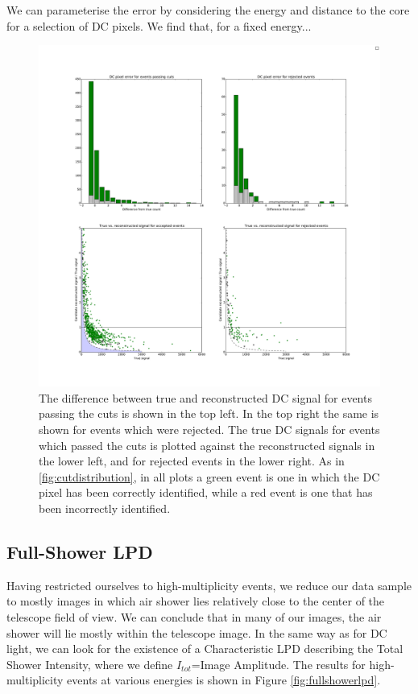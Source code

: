 \documentclass{article}
\begin{document}
We can parameterise the error by considering the energy and distance to the core for a selection of DC pixels. We find that, for a fixed energy...

\begin{figure}
\begin{center}
\includegraphics[width=\textwidth]{DCcounterrorhess1rgrbigtestdata}
\caption{The difference between true and reconstructed DC signal for events passing the cuts is shown in the top left. In the top right the same is shown for events which were rejected. The true DC signals for events which passed the cuts is plotted against the reconstructed signals in the lower left, and for rejected events in the lower right. As in \ref{fig:cutdistribution}, in all plots a green event is one in which the DC pixel has been correctly identified, while a red event is one that has been incorrectly identified.}
\label{fig:dcdiff}
\end{center}
\end{figure}

\subsection{Full-Shower LPD}
Having restricted ourselves to high-multiplicity events, we reduce our data sample to mostly images in which air shower lies relatively close to the center of the telescope field of view. We can conclude that in many of our images, the air shower will lie mostly within the telescope image. In the same way as for DC light, we can look for the existence of a Characteristic LPD describing the Total Shower Intensity, where we define $I_{tot}$=Image Amplitude. The results for high-multiplicity events at various energies is shown in Figure \ref{fig:fullshowerlpd}.
\end{document}
